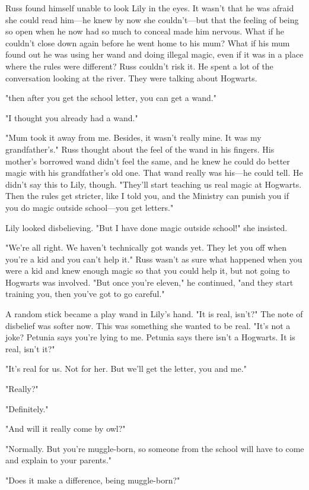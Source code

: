 Russ found himself unable to look Lily in the eyes. It wasn't that he was afraid she could read him—he knew by now she couldn't—but that the feeling of being so open when he now had so much to conceal made him nervous. What if he couldn't close down again before he went home to his mum? What if his mum found out he was using her wand and doing illegal magic, even if it was in a place where the rules were different? Russ couldn't risk it. He spent a lot of the conversation looking at the river. They were talking about Hogwarts.

"{\el}then after you get the school letter, you can get a wand."

"I thought you already had a wand."

"Mum took it away from me. Besides, it wasn't really mine. It was my grandfather's." Russ thought about the feel of the wand in his fingers. His mother's borrowed wand didn't feel the same, and he knew he could do better magic with his grandfather's old one. That wand really was his—he could tell. He didn't say this to Lily, though. "They'll start teaching us real magic at Hogwarts. Then the rules get stricter, like I told you, and the Ministry can punish you if you do magic outside school—you get letters."

Lily looked disbelieving. "But I have done magic outside school!" she insisted.

"We're all right. We haven't technically got wands yet. They let you off when you're a kid and you can't help it." Russ wasn't as sure what happened when you were a kid and knew enough magic so that you could help it, but not going to Hogwarts was involved. "But once you're eleven," he continued, "and they start training you, then you've got to go careful."

A random stick became a play wand in Lily's hand. "It is real, isn't?" The note of disbelief was softer now. This was something she wanted to be real. "It's not a joke? Petunia says you're lying to me. Petunia says there isn't a Hogwarts. It is real, isn't it?"

"It's real for us. Not for her. But we'll get the letter, you and me."

"Really?"

"Definitely."

"And will it really come by owl?"

"Normally. But you're muggle-born, so someone from the school will have to come and explain to your parents."

"Does it make a difference, being muggle-born?"

